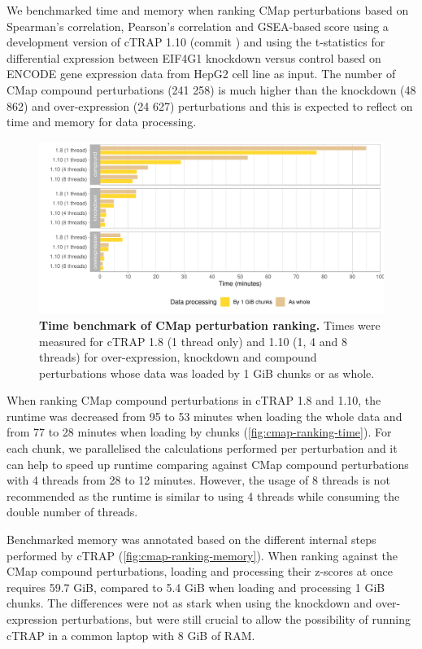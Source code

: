 We benchmarked time and memory when ranking CMap perturbations based on Spearman's correlation, Pearson's correlation and GSEA-based score using a development version of cTRAP 1.10 (commit ) and using the t-statistics for differential expression between EIF4G1 knockdown versus control based on ENCODE gene expression data from HepG2 cell line as input. The number of CMap compound perturbations (241 258) is much higher than the knockdown (48 862) and over-expression (24 627) perturbations and this is expected to reflect on time and memory for data processing.

\begin{figure}[!b]
  \includegraphics[width=\textwidth]{images/ctrap/ranking-time}
  \centering
  \caption[Time benchmark of CMap perturbation ranking]{\textbf{Time benchmark of CMap perturbation ranking.} Times were measured for cTRAP 1.8 (1 thread only) and 1.10 (1, 4 and 8 threads) for over-expression, knockdown and compound perturbations whose data was loaded by 1 GiB chunks or as whole.}
  \label{fig:cmap-ranking-time}
\end{figure}

When ranking CMap compound perturbations in cTRAP 1.8 and 1.10, the runtime was decreased from 95 to 53 minutes when loading the whole data and from 77 to 28 minutes when loading by chunks (\autoref{fig:cmap-ranking-time}). For each chunk, we parallelised the calculations performed per perturbation and it can help to speed up runtime comparing against CMap compound perturbations with 4 threads from 28 to 12 minutes. However, the usage of 8 threads is not recommended as the runtime is similar to using 4 threads while consuming the double number of threads.

Benchmarked memory was annotated based on the different internal steps performed by cTRAP (\autoref{fig:cmap-ranking-memory}). When ranking against the CMap compound perturbations, loading and processing their z-scores at once requires 59.7 GiB, compared to 5.4 GiB when loading and processing 1 GiB chunks. The differences were not as stark when using the knockdown and over-expression perturbations, but were still crucial to allow the possibility of running cTRAP in a common laptop with 8 GiB of RAM. %

